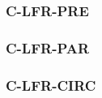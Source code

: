 \begin{paracol}{2}
\linenumbers
\switchcolumn

\subsubsection{C-LFR-PRE}



\subsubsection{C-LFR-PAR}


\subsubsection{C-LFR-CIRC}





\end{paracol}
